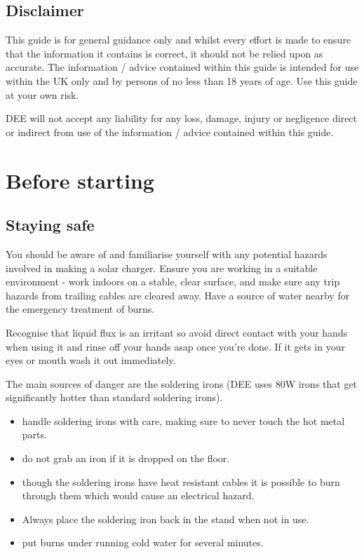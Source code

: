 \documentclass{article}
\theoremstyle{definition}
\theoremstyle{definition}
\theoremstyle{remark}
\begin{document}
  
  {\color{blue}\subsection{Disclaimer}} %
  \label{sub:disclaimer}

    This guide is for general guidance only and whilst every effort is made to ensure that the information it contains is correct, it should not be relied upon as accurate. The information / advice contained within this guide is intended for use within the UK only and by persons of no less than 18 years of age. Use this guide at your own risk.
    
    DEE will not accept any liability for any loss, damage, injury or negligence direct or indirect from use of the information / advice contained within this guide.


  \newpage  


{\color{blue}\section{Before starting}} %
\label{sec:before_starting}

  {\color{blue}\subsection{Staying safe}} %
  \label{sub:staying_safe}

    You should be aware of and familiarise yourself with any potential hazards involved in making a solar charger. Ensure you are working in a suitable environment - work indoors on a stable, clear surface, and make sure any trip hazards from trailing cables are cleared away. Have a source of water nearby for the emergency treatment of burns.

    Recognise that liquid flux is an irritant so avoid direct contact with your hands when using it and rinse off your hands asap once you’re done. If it gets in your eyes or mouth wash it out immediately.

    The main sources of danger are the soldering irons (DEE uses 80W irons that get significantly hotter than standard soldering irons). 

    \begin{itemize}
      \item handle soldering irons with care, making sure to never touch the hot metal parts. 
      \item do not grab an iron if it is dropped on the floor. 
      \item though the soldering irons have heat resistant cables it is possible to burn through them which would cause an electrical hazard.
      \item Always place the soldering iron back in the stand when not in use.
      \item put burns under running cold water for several minutes. 
    \end{itemize}
\end{document}
